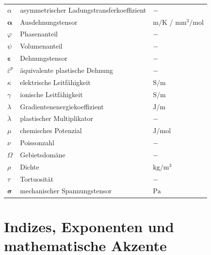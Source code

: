 {\begin{longtable}{@{}p{\TabulatorVZ}@{}p{\TabulatorTX}p{\TabulatorEH}@{}}
	$\alpha$				& asymmetrischer Ladungstransferkoeffizient & $-$\\
	$\boldsymbol{\alpha}$   & Ausdehnungstensor				& $\si{\metre\per\kelvin}$ / $\si{\metre\metre\cubed\per\mole}$\\
	$\varphi$           	& Phasenanteil                  & $-$\\
	$\psi$					& Volumenanteil					& $-$\\
    $\boldsymbol{\varepsilon}$ & Dehnungstensor				& $-$\\
	$\bar{\varepsilon}^p$ 	& äquivalente plastische Dehnung  & $-$ \\
	$\kappa$				& elektrische Leitfähigkeit		& $\si{\siemens\per\metre}$\\
    $\gamma$				& ionische Leitfähigkeit		& $\si{\siemens\per\metre}$\\
    $\lambda$               & Gradientenenergiekoeffizient  & $\si{\joule\per\metre}$\\
    $\dot{\lambda}$     	& plastischer Multiplikator         & $-$ \\
	$\mu$                   & chemisches Potenzial          & $\si{\joule\per\mole}$\\
	$\nu$					& Poissonzahl					& $-$\\
    $\Omega$                & Gebietsdomäne                 & $-$\\
	$\rho$					& Dichte						& $\si{\kilo\gram\per\metre\cubed}$\\
	$\tau$ 					& Tortuosität & $-$ \\
	$\boldsymbol{\sigma}$	& mechanischer Spannungstensor	& $\si{\pascal}$ 
\end{longtable}

\section*{Indizes, Exponenten und mathematische Akzente}

}
